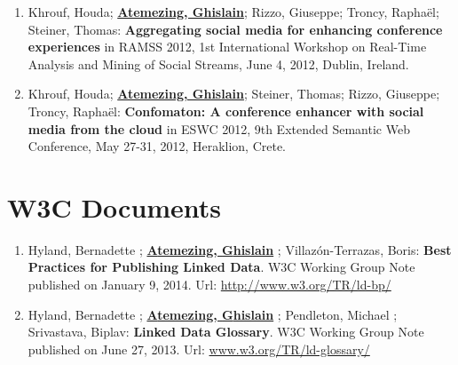 \begin{enumerate}
\item Khrouf, Houda; \underline{\textbf{Atemezing, Ghislain}}; Rizzo, Giuseppe; Troncy, Rapha\"{e}l; Steiner, Thomas:
\textbf{Aggregating social media for enhancing conference experiences} in RAMSS 2012, 1st International Workshop on Real-Time Analysis and Mining of Social Streams, June 4, 2012, Dublin, Ireland.

\item Khrouf, Houda; \underline{\textbf{Atemezing, Ghislain}}; Steiner, Thomas; Rizzo, Giuseppe; Troncy, Rapha\"{e}l: 
\textbf{Confomaton: A conference enhancer with social media from the cloud} in ESWC 2012, 9th Extended Semantic Web Conference, May 27-31, 2012, Heraklion, Crete.


\end{enumerate}

\section*{W3C Documents}
\label{sec:w3cdocs}
\begin{enumerate}
\item {H}yland, {B}ernadette ; \underline{\textbf{{A}temezing, {G}hislain}} ; {V}illaz{\'o}n-{T}errazas, {B}oris: \textbf{Best Practices for Publishing Linked Data}. W3C Working Group Note published on January 9, 2014. Url: \url{http://www.w3.org/TR/ld-bp/}

\item {H}yland, {B}ernadette ; \underline{\textbf{{A}temezing, {G}hislain}} ;  {P}endleton, {M}ichael ; {S}rivastava, {B}iplav: \textbf{Linked Data Glossary}. W3C Working Group Note published on June 27, 2013. Url: \url{www.w3.org/TR/ld-glossary/}

\end{enumerate}